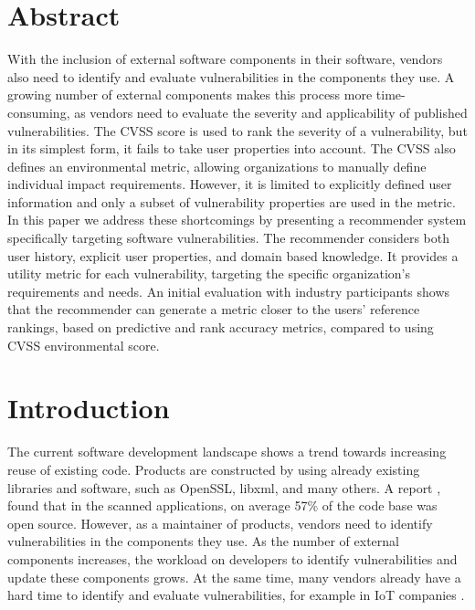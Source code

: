 {%
	

\section*{Abstract}
With the inclusion of external software components in their software, vendors also need to identify and evaluate vulnerabilities in the components they use.
A growing number of external components makes this process more time-consuming, as vendors need to evaluate the severity and applicability of published vulnerabilities.
The CVSS score is used to rank the severity of a vulnerability, but in its simplest form, it fails to take user properties into account.
The CVSS also defines an environmental metric, allowing organizations to manually define individual impact requirements.
However, it is limited to explicitly defined user information and only a subset of vulnerability properties are used in the metric.
In this paper we address these shortcomings by presenting a recommender system specifically targeting software vulnerabilities.
The recommender considers both user history, explicit user properties, and domain based knowledge.
It provides a utility metric for each vulnerability, targeting the specific organization's requirements and needs.
An initial evaluation with industry participants shows that the recommender can generate a metric closer to the users' reference rankings, based on predictive and rank accuracy metrics, compared to using CVSS environmental score.



\section{Introduction}
The current software development landscape shows a trend towards increasing reuse of existing code.
Products are constructed by using already existing libraries and software, such as OpenSSL, libxml, and many others.
A report \cite{synopsis:2018}, found that in the scanned applications, on average 57\% of the code base was open source.
However, as a maintainer of products, vendors need to identify vulnerabilities in the components they use.
As the number of external components increases, the workload on developers to identify vulnerabilities and update these components grows.
At the same time, many vendors already have a hard time to identify and evaluate vulnerabilities, for example in IoT companies
\cite{host:2018}. %

}
